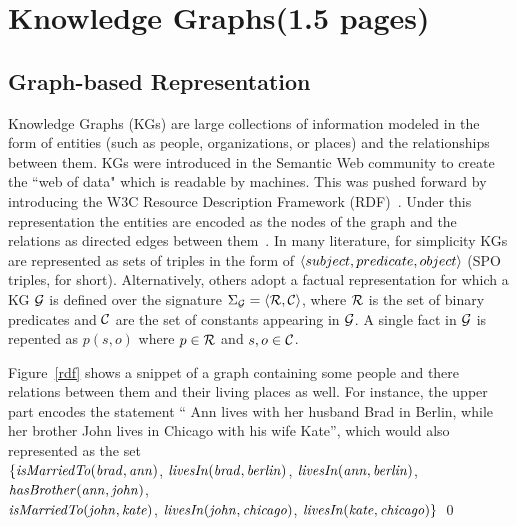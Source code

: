 \section{Knowledge Graphs(1.5 pages)}
\label{sec:kgs}

\subsection{Graph-based Representation}
Knowledge Graphs (KGs) are large collections of information modeled in the form of entities (such as people, organizations, or places) and the relationships between them. KGs were introduced in the Semantic Web community to create the ``web of data" which is readable by machines. This was pushed forward by introducing the W3C Resource Description Framework (RDF)~\cite{rdf2004}. Under this representation the entities are encoded as the nodes of the graph and the relations as directed edges between them~\cite{Nickel2015ARO}. In many literature, for simplicity KGs are represented as sets of triples in the form of $\langle subject, predicate,object\rangle$ (SPO triples, for short). Alternatively, %
others adopt a factual representation for which a KG $\mathcal{G}$ is defined over the signature $\Sigma_{\mathcal{G}}=\langle\mathcal{R},\mathcal{C}\rangle$, where $\mathcal{R}$ is the set of binary predicates and $\mathcal{C}$  are the set of constants appearing in $\mathcal{G}$.  A single fact in $\mathcal{G}$ is repented as $p(s,o)$ where $p \in \mathcal{R}$ and $s,o \in \mathcal{C}$. 

\begin{example} Figure~\ref{rdf} shows a snippet of a graph containing some people and there relations between them and their living places as well. For instance, the upper part encodes the statement `` Ann lives with her husband Brad in Berlin, while her brother John lives in Chicago with his wife Kate'', which would also represented as the set \\$\{ \mathit{isMarriedTo(brad, ann)}$,  $\mathit{livesIn(brad, berlin)}$, $\mathit{livesIn(ann, berlin)}$,\\ $\mathit{hasBrother(ann, john)}$,\\ $\mathit{isMarriedTo(john, kate)}$, $\mathit{livesIn(john, chicago)}$, $\mathit{livesIn(kate, chicago)} \}$ \qed
\end{example}





